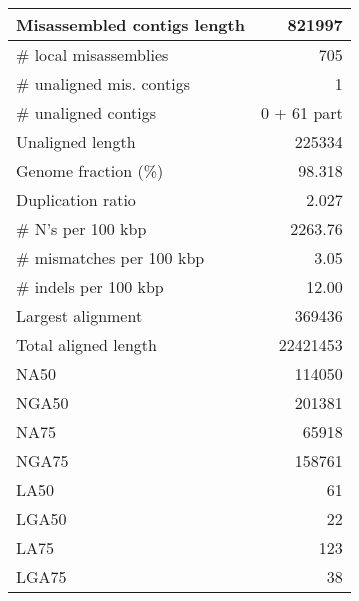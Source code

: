 \documentclass[a4paper]{article}
\begin{document}
\begin{table}[ht]
\begin{center}
\begin{tabular}{|l*{1}{|r}|}
Misassembled contigs length & 821997 \\ \hline
\# local misassemblies & 705 \\ \hline
\# unaligned mis. contigs & 1 \\ \hline
\# unaligned contigs & 0 + 61 part \\ \hline
Unaligned length & 225334 \\ \hline
Genome fraction (\%) & 98.318 \\ \hline
Duplication ratio & 2.027  \\ \hline
\# N's per 100 kbp & 2263.76  \\ \hline
\# mismatches per 100 kbp & 3.05 \\ \hline
\# indels per 100 kbp & 12.00 \\ \hline
Largest alignment & 369436 \\ \hline
Total aligned length & 22421453 \\ \hline
NA50 & 114050  \\ \hline
NGA50 & 201381 \\ \hline
NA75 & 65918 \\ \hline
NGA75 & 158761 \\ \hline
LA50 & 61 \\ \hline
LGA50 & 22 \\ \hline
LA75 & 123 \\ \hline
LGA75 & 38 \\ \hline
\end{tabular}
\end{center}
\end{table}
\end{document}
